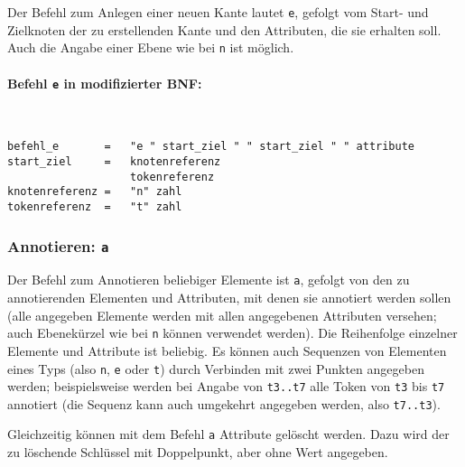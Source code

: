 \documentclass[12pt]{scrartcl}
\begin{document}
Der Befehl zum Anlegen einer neuen Kante lautet \texttt{e}, gefolgt vom Start- und Zielknoten der zu erstellenden  Kante und den Attributen, die sie erhalten soll. Auch die Angabe einer Ebene wie bei \texttt{n} ist möglich.

\paragraph*{Befehl \texttt{e} in modifizierter BNF:}
~
\begin{framed}
\begin{lstlisting}
befehl_e       =   "e " start_ziel " " start_ziel " " attribute
start_ziel     =   knotenreferenz
                   tokenreferenz
knotenreferenz =   "n" zahl
tokenreferenz  =   "t" zahl
\end{lstlisting}
\end{framed}


\subsubsection{Annotieren: \texttt{a}}\label{befehl-a}

Der Befehl zum Annotieren beliebiger Elemente ist \texttt{a}, gefolgt von den zu annotierenden Elementen und Attributen, mit denen sie annotiert werden sollen (alle angegeben Elemente werden mit allen angegebenen Attributen versehen; auch Ebenekürzel wie bei \texttt{n} können verwendet werden). Die Reihenfolge einzelner Elemente und Attribute ist beliebig. Es können auch Sequenzen von Elementen eines Typs (also \texttt{n}, \texttt{e} oder \texttt{t}) durch Verbinden mit zwei Punkten angegeben werden; beispielsweise werden bei Angabe von \texttt{t3..t7} alle Token von \texttt{t3} bis \texttt{t7} annotiert (die Sequenz kann auch umgekehrt angegeben werden, also \texttt{t7..t3}).

Gleichzeitig können mit dem Befehl \texttt{a} Attribute gelöscht werden. Dazu wird der zu löschende Schlüssel mit Doppelpunkt, aber ohne Wert angegeben.
\end{document}
